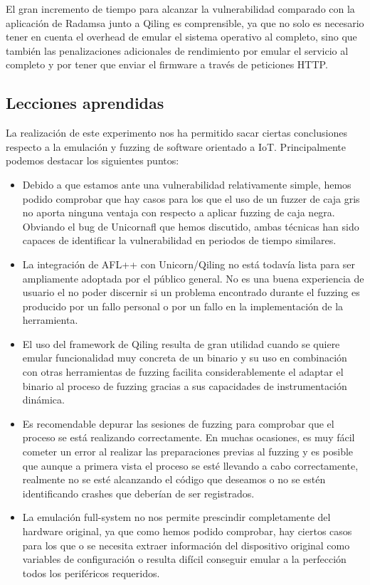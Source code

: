 El gran incremento de tiempo para alcanzar la vulnerabilidad comparado con la aplicación de Radamsa junto a Qiling es comprensible, ya que 
no solo es necesario tener en cuenta el overhead de emular el sistema operativo al completo, sino que también las penalizaciones adicionales 
de rendimiento por emular el servicio al completo y por tener que enviar el firmware a través de peticiones HTTP.

\subsection{Lecciones aprendidas}
La realización de este experimento nos ha permitido sacar ciertas conclusiones respecto a la emulación y fuzzing de software orientado a IoT.
Principalmente podemos destacar los siguientes puntos:
\begin{itemize}
    \item Debido a que estamos ante una vulnerabilidad relativamente simple, hemos podido comprobar que hay casos para los que el uso de un 
    fuzzer de caja gris no aporta ninguna ventaja con respecto a aplicar fuzzing de caja negra. Obviando el bug de Unicornafl que hemos
    discutido, ambas técnicas han sido capaces de identificar la vulnerabilidad en periodos de tiempo similares.
    \item La integración de AFL++ con Unicorn/Qiling no está todavía lista para ser ampliamente adoptada por el público general. No es una 
    buena experiencia de usuario el no poder discernir si un problema encontrado durante el fuzzing es producido por un fallo personal 
    o por un fallo en la implementación de la herramienta.
    \item El uso del framework de Qiling resulta de gran utilidad cuando se quiere emular funcionalidad muy concreta de un binario y su 
    uso en combinación con otras herramientas de fuzzing facilita considerablemente el adaptar el binario al proceso de fuzzing gracias a 
    sus capacidades de instrumentación dinámica.
    \item Es recomendable depurar las sesiones de fuzzing para comprobar que el proceso se está realizando correctamente. En muchas ocasiones,
    es muy fácil cometer un error al realizar las preparaciones previas al fuzzing y es posible que aunque a primera vista el proceso se esté 
    llevando a cabo correctamente, realmente no se esté alcanzando el código que deseamos o no se estén identificando crashes que deberían de 
    ser registrados.
    \item La emulación full-system no nos permite prescindir completamente del hardware original, ya que como hemos podido comprobar, hay ciertos 
    casos para los que o se necesita extraer información del dispositivo original como variables de configuración o resulta difícil conseguir 
    emular a la perfección todos los periféricos requeridos.
\end{itemize}
